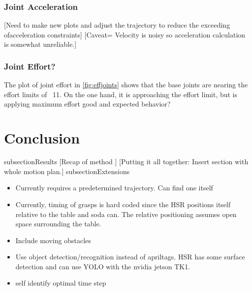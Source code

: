 \documentclass[12pt]{article}
\begin{document}
        \subsubsection{Joint Acceleration}
            [Need to make new plots and adjust the trajectory to reduce the exceeding ofacceleration constraints]
            [Caveat= Velocity is noisy so acceleration calculation is somewhat unreliable.]
        
        \subsubsection{Joint Effort?}
            The plot of joint effort in \autoref{fig:effjoints} shows that the base joints are nearing the effort limits of ~11. On the one hand, it is approaching the effort limit, but is applying maximum effort good and expected behavior?

    \newpage     
    \section{Conclusion}
        subsection{Results}
            [Recap of method ]
            [Putting it all together: Insert section with whole motion plan.]
        subsection{Extensions}
            \begin{itemize}
                \item Currently requires a predetermined trajectory. Can find one itself
                \item Currently, timing of grasps is hard coded since the HSR positions itself relative to the table and soda can. The relative positioning assumes open space surrounding the table.
                \item Include moving obstacles
                \item Use object detection/recognition instead of apriltags. HSR has some surface detection and can use YOLO with the nvidia jetson TK1.
                \item self identify optimal time step
            \end{itemize}

                
            

                
\end{document}
